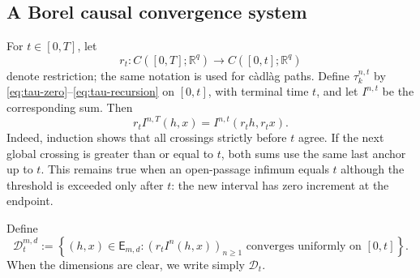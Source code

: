 \documentclass[11pt,reqno]{amsart}
\theoremstyle{plain}
\theoremstyle{definition}
\newcommand{\R}{\mathbb R}
\newcommand{\cD}{\mathcal D}
\begin{document}
\subsection{A Borel causal convergence system}

For \(t\in[0,T]\), let
\[
  r_t:C([0,T];\R^q)\longrightarrow C([0,t];\R^q)
\]
denote restriction; the same notation is used for c\`adl\`ag paths.  Define
\(\tau_k^{n,t}\) by \eqref{eq:tau-zero}--\eqref{eq:tau-recursion} on
\([0,t]\), with terminal time \(t\), and let \(I^{n,t}\) be the corresponding
sum.  Then
\begin{equation}\label{eq:horizon-consistency}
  r_t I^{n,T}(h,x)
  =
  I^{n,t}(r_th,r_tx).
\end{equation}
Indeed, induction shows that all crossings strictly before \(t\) agree.  If
the next global crossing is greater than or equal to \(t\), both sums use the
same last anchor up to \(t\).  This remains true when an open-passage
infimum equals \(t\) although the threshold is exceeded only after \(t\):
the new interval has zero increment at the endpoint.

Define
\begin{equation}\label{eq:Dt-def}
  \cD_t^{m,d}
  :=
  \left\{
    (h,x)\in\mathsf E_{m,d}:
    (r_tI^n(h,x))_{n\ge1}
    \text{ converges uniformly on }[0,t]
  \right\}.
\end{equation}
When the dimensions are clear, we write simply \(\cD_t\).
\end{document}

